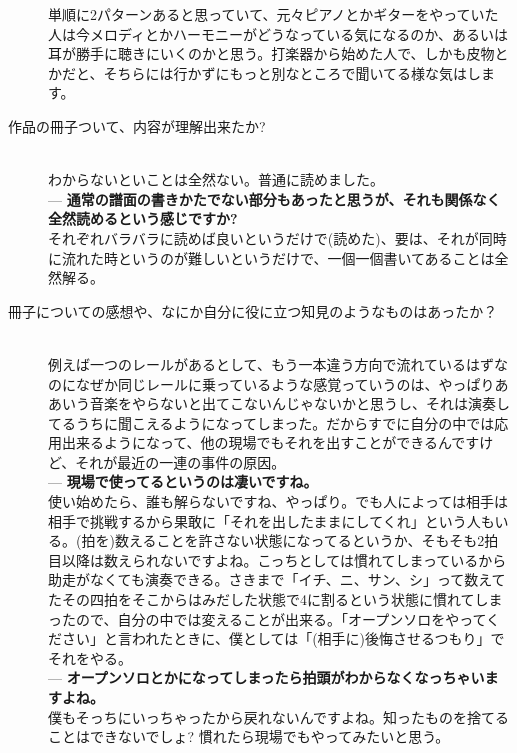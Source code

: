 \documentclass[uplatex,dvipdfmx]{ujarticle}
\begin{document}
\begin{description}
単順に2パターンあると思っていて、元々ピアノとかギターをやっていた人は今メロディとかハーモニーがどうなっている気になるのか、あるいは耳が勝手に聴きにいくのかと思う。打楽器から始めた人で、しかも皮物とかだと、そちらには行かずにもっと別なところで聞いてる様な気はします。

\item [作品の冊子ついて、内容が理解出来たか?]\mbox{}\\

わからないといことは全然ない。普通に読めました。\\

--- {\bf 通常の譜面の書きかたでない部分もあったと思うが、それも関係なく全然読めるという感じですか?}\\

それぞれバラバラに読めば良いというだけで(読めた)、要は、それが同時に流れた時というのが難しいというだけで、一個一個書いてあることは全然解る。\\

\item [冊子についての感想や、なにか自分に役に立つ知見のようなものはあったか？]\mbox{}\\

例えば一つのレールがあるとして、もう一本違う方向で流れているはずなのになぜか同じレールに乗っているような感覚っていうのは、やっぱりああいう音楽をやらないと出てこないんじゃないかと思うし、それは演奏してるうちに聞こえるようになってしまった。だからすでに自分の中では応用出来るようになって、他の現場でもそれを出すことができるんですけど、それが最近の一連の事件の原因。\\

--- {\bf 現場で使ってるというのは凄いですね。}\\

使い始めたら、誰も解らないですね、やっぱり。でも人によっては相手は相手で挑戦するから果敢に「それを出したままにしてくれ」という人もいる。(拍を)数えることを許さない状態になってるというか、そもそも2拍目以降は数えられないですよね。こっちとしては慣れてしまっているから助走がなくても演奏できる。さきまで「イチ、ニ、サン、シ」って数えてたその四拍をそこからはみだした状態で4に割るという状態に慣れてしまったので、自分の中では変えることが出来る。「オープンソロをやってください」と言われたときに、僕としては「(相手に)後悔させるつもり」でそれをやる。\\

--- {\bf オープンソロとかになってしまったら拍頭がわからなくなっちゃいますよね。}\\

僕もそっちにいっちゃったから戻れないんですよね。知ったものを捨てることはできないでしょ? 慣れたら現場でもやってみたいと思う。\\


\end{description}
\end{document}
